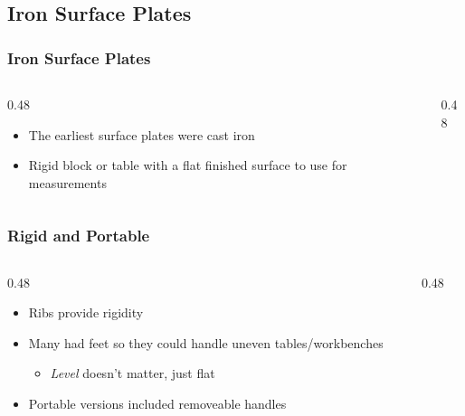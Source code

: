 \subsection{Iron Surface Plates}

\begin{frame}
	\frametitle{Iron Surface Plates}

    \begin{columns}
        \begin{column}{0.48\linewidth}
            \begin{itemize}[<+- | alert@+>]
                \item The earliest surface plates were cast iron
                \item Rigid block or table with a flat finished surface to use for measurements
            \end{itemize}
        \end{column}
        \begin{column}{0.48\linewidth}
        \end{column}
    \end{columns}
\end{frame}

\begin{frame}
	\frametitle{Rigid and Portable}

    \begin{columns}
        \begin{column}{0.48\linewidth}
            \begin{itemize}[<+- | alert@+>]                
                \item Ribs provide rigidity 
                \item Many had feet so they could handle uneven tables/workbenches
                    \begin{itemize}
                        \item \emph{Level} doesn't matter, just flat
                    \end{itemize}
                \item Portable versions included removeable handles
            \end{itemize}
        \end{column}
        \begin{column}{0.48\linewidth}
        \end{column}
    \end{columns}
\end{frame}

